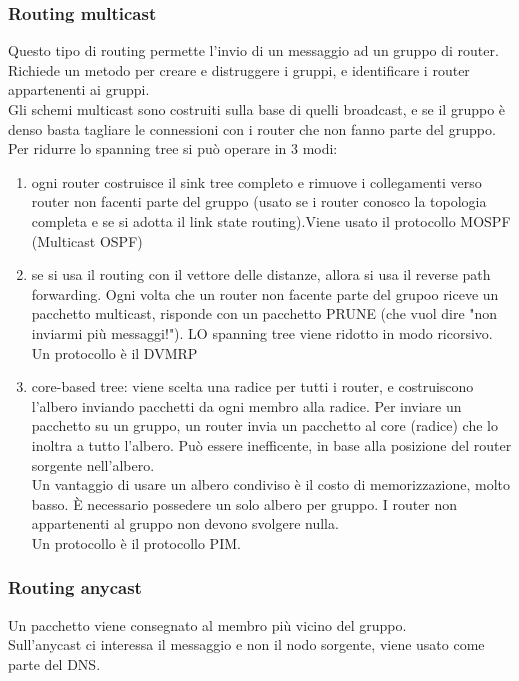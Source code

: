 \documentclass{article}
\begin{document}
\subsubsection{Routing multicast}
Questo tipo di routing permette l'invio di un messaggio ad un gruppo di router. Richiede un metodo per creare e distruggere i gruppi, e identificare i router appartenenti ai gruppi.\\
Gli schemi multicast sono costruiti sulla base di quelli broadcast, e se il gruppo è denso basta tagliare le connessioni con i router che non fanno parte del gruppo.\\
Per ridurre lo spanning tree si può operare in 3 modi:
\begin{enumerate}
    \item ogni router costruisce il sink tree completo e rimuove i collegamenti verso router non facenti parte del gruppo (usato se i router conosco la topologia completa e se si adotta il link state routing).Viene usato il protocollo MOSPF (Multicast OSPF)
    \item se si usa il routing con il vettore delle distanze, allora si usa il reverse path forwarding. Ogni volta che un router non facente parte del grupoo riceve un pacchetto multicast, risponde con un pacchetto PRUNE (che vuol dire "non inviarmi più messaggi!"). LO spanning tree viene ridotto in modo ricorsivo. Un protocollo è il DVMRP
    \item core-based tree: viene scelta una radice per tutti i router, e costruiscono l'albero inviando pacchetti da ogni membro alla radice. Per inviare un pacchetto su un gruppo, un router invia un pacchetto al core (radice) che lo inoltra a tutto l'albero. Può essere inefficente, in base alla posizione del router sorgente nell'albero.\\
Un vantaggio di usare un albero condiviso è il costo di memorizzazione, molto basso. È necessario possedere un solo albero per gruppo. I router non appartenenti al gruppo non devono svolgere nulla.\\ Un protocollo è il protocollo PIM.
\end{enumerate}
\subsubsection{Routing anycast}
Un pacchetto viene consegnato al membro più vicino del gruppo.\\
Sull'anycast ci interessa il messaggio e non il nodo sorgente, viene usato come parte del DNS.
\end{document}
